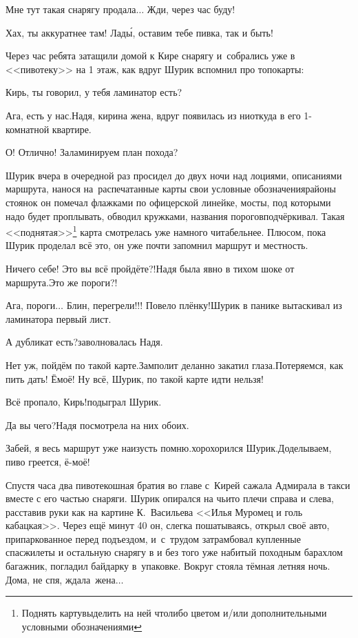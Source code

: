 \diagdash Мне тут такая снарягу продала$\ldots$ Жди, через час буду!

\diagdash Хах, ты аккуратнее там! Лад\'{ы}, оставим тебе пивка, так и быть!

Через час ребята затащили домой к Кире снарягу и~собрались уже в <<пивотеку>> на 1 этаж, как вдруг Шурик вспомнил про топокарты:

\diagdash Кирь, ты говорил, у тебя ламинатор есть?

\diagdash Ага, есть у нас.\mdash Надя, кирина жена, вдруг появилась из ниоткуда в его 1-комнатной квартире.

\diagdash О! Отлично! Заламинируем план похода?

\renewcommand*{\thefootnote}{\fnsymbol{footnote}}
Шурик вчера в очередной раз просидел до двух ночи над лоциями, описаниями маршрута, нанося на~распечатанные карты свои условные обозначения\mdash районы стоянок он помечал флажками по офицерской линейке, мосты, под которыми надо будет проплывать, обводил кружками, названия порогов\mdash подчёркивал. Такая <<поднятая>>\footnote[1]{Поднять карту\mdash выделить на ней что\sdash либо цветом и/или дополнительными условными обозначениями} карта смотрелась уже намного читабельнее. Плюсом, пока Шурик проделал всё это, он уже почти запомнил маршрут и местность.

\diagdash Ничего себе! Это вы всё пройдёте?!\mdash Надя была явно в тихом шоке от маршрута.\mdash Это же пороги?!

\diagdash Ага, пороги$\ldots$ Блин, перегрели!!! Повело плёнку!\mdash Шурик в панике вытаскивал из ламинатора первый лист.%

\diagdash А дубликат есть?\mdash заволновалась Надя.

\diagdash Нет уж, пойдём по такой карте.\mdash Замполит деланно закатил глаза.\mdash Потеряемся, как пить дать! Ё\sdash моё! Ну всё, Шурик, по такой карте идти нельзя! 

\diagdash Всё пропало, Кирь!\mdash подыграл Шурик.

\diagdash Да вы чего?\mdash Надя посмотрела на них обоих.

\diagdash Забей, я весь маршрут уже наизусть помню.\mdash хорохорился Шурик.\mdash Доделываем, пиво греется, ё-моё!

Спустя часа два пивотекошная братия во главе с~Кирей сажала Адмирала в такси вместе с его частью снаряги. Шурик опирался на чьи\sdash то плечи справа и слева, расставив руки как на картине К.~Васильева <<Илья Муромец и голь кабацкая>>. Через ещё минут 40 он, слегка пошатываясь, открыл своё авто, припаркованное перед подъездом, и~с~трудом затрамбовал купленные спасжилеты и остальную снарягу в и без того уже набитый походным барахлом багажник, погладил байдарку в~упаковке. Вокруг стояла тёмная летняя ночь. Дома, не спя, ждала~жена$\ldots$

\begin{center}
\end{center}
